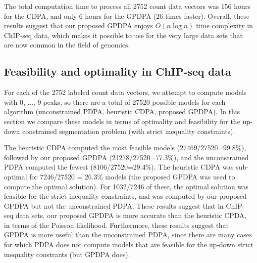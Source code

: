 \documentclass[twoside,11pt]{article}
\begin{document}
The total computation time to process all 2752 count data vectors was
156 hours for the CDPA, and only 6 hours for the GPDPA (26 times
faster). Overall, these results suggest that our proposed GPDPA enjoys
$O(n\log n)$ time complexity in ChIP-seq data, which makes it possible
to use for the very large data sets that are now common in the field of genomics.

\subsection{Feasibility and optimality in ChIP-seq data}

For each of the 2752 labeled count data vectors, we attempt to compute
models with 0, ..., 9 peaks, so there are a total of 27520 possible
models for each algorithm (unconstrained PDPA, heuristic CDPA,
proposed GPDPA). In this section we compare these models in terms of
optimality and feasibility for the up-down constrained segmentation
problem (with strict inequality constraints).

The heuristic CDPA computed the most feasible models
(27469/27520=99.8\%), followed by our proposed GPDPA
(21278/27520=77.3\%), and the unconstrained PDPA computed the fewest
(8106/27520=29.4\%). The heuristic CDPA was sub-optimal for 7246/27520 = 26.3\%
models (the proposed GPDPA was used to compute the optimal solution). 
For 1032/7246 of these, the optimal solution was feasible for the
strict inequality constraints, and was computed by our proposed GPDPA
but not the unconstrained PDPA. 
These results suggest that in ChIP-seq data
sets, our proposed GPDPA is more accurate than the heuristic CPDA, in terms of the Poisson likelihood. 
Furthermore, these results suggest
that GPDPA is more useful than the unconstrained PDPA, since there are
many cases for which PDPA does not compute models that are feasible
for the up-down strict inequality constrants (but GPDPA does).


\end{document}
